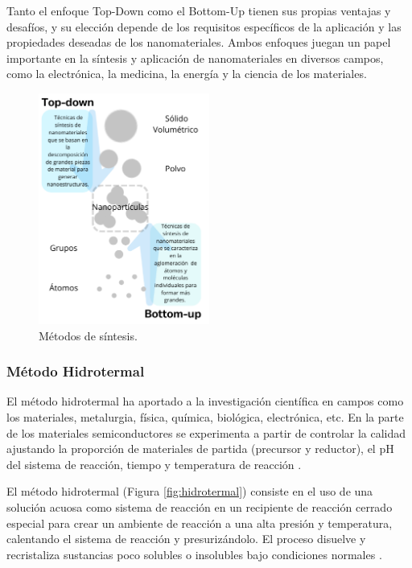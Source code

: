 \documentclass[12pt]{article}
\begin{document}
    Tanto el enfoque Top-Down como el Bottom-Up tienen sus propias ventajas y desafíos, y su elección depende de los requisitos específicos de la aplicación y las propiedades deseadas de los nanomateriales. Ambos enfoques juegan un papel importante en la síntesis y aplicación de nanomateriales en diversos campos, como la electrónica, la medicina, la energía y la ciencia de los materiales.
    \begin{figure}[H]
    	   \begin{center}
     	  	\includegraphics[width = 0.5\textwidth]{Imagenes/Metodos de Sintesis.png}
     	  	\caption{Métodos de síntesis\cite{IEEEreferencias:TOPDOWN_BOTTOMUP_1}.}\label{fig:Metodos de Sintesis}  
    	   \end{center} 
        \end{figure}
     

        \subsubsection{Método Hidrotermal}
           El método hidrotermal ha aportado a la investigación científica en campos como los materiales, metalurgia, física, química, biológica, electrónica, etc.  En la parte de los materiales semiconductores se experimenta a partir de controlar la calidad ajustando la proporción de materiales de partida (precursor y reductor), el pH del sistema de reacción, tiempo y temperatura de reacción \cite{IEEEreferencias:Ref10}.\vspace{1em} %
        
        El método hidrotermal (Figura \ref{fig:hidrotermal}) consiste en el uso de una solución acuosa como sistema de reacción en un recipiente de reacción cerrado especial para crear un ambiente de reacción a una alta presión y temperatura, calentando el sistema de reacción y presurizándolo. El proceso disuelve y recristaliza sustancias poco solubles o insolubles bajo condiciones normales \cite{IEEEreferencias:Ref10}.\vspace{1em} %
\end{document}
